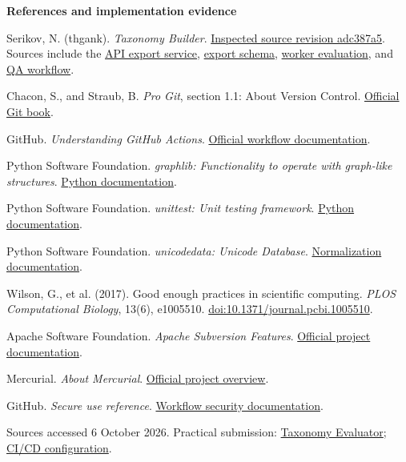 \documentclass[12pt,a4paper]{article}
\newcommand{\link}[2]{\href{#1}{#2}}
\begin{document}
\noindent\textbf{References and implementation evidence}\par
\noindent [1] Serikov, N. (thgank). \textit{Taxonomy Builder}. \link{https://github.com/thgank/taxonomy-builder/tree/adc387a5d227bf3ebb9c79a3fa0429415fe8b9cc}{Inspected source revision adc387a5}. Sources include the \link{https://github.com/thgank/taxonomy-builder/blob/adc387a5d227bf3ebb9c79a3fa0429415fe8b9cc/api-service/src/main/java/com/taxonomy/api/service/TaxonomyService.java}{API export service}, \link{https://github.com/thgank/taxonomy-builder/blob/adc387a5d227bf3ebb9c79a3fa0429415fe8b9cc/api-service/src/main/java/com/taxonomy/api/dto/response/TaxonomyExportResponse.java}{export schema}, \link{https://github.com/thgank/taxonomy-builder/blob/adc387a5d227bf3ebb9c79a3fa0429415fe8b9cc/worker-service/app/pipeline/evaluation.py}{worker evaluation}, and \link{https://github.com/thgank/taxonomy-builder/blob/adc387a5d227bf3ebb9c79a3fa0429415fe8b9cc/.github/workflows/qa.yml}{QA workflow}.\par
\noindent [2] Chacon, S., and Straub, B. \textit{Pro Git}, section 1.1: About Version Control. \link{https://git-scm.com/book/en/v2/Getting-Started-About-Version-Control}{Official Git book}.\par
\noindent [3] GitHub. \textit{Understanding GitHub Actions}. \link{https://docs.github.com/en/actions/get-started/understand-github-actions}{Official workflow documentation}.\par
\noindent [4] Python Software Foundation. \textit{graphlib: Functionality to operate with graph-like structures}. \link{https://docs.python.org/3/library/graphlib.html}{Python documentation}.\par
\noindent [5] Python Software Foundation. \textit{unittest: Unit testing framework}. \link{https://docs.python.org/3/library/unittest.html}{Python documentation}.\par
\noindent [6] Python Software Foundation. \textit{unicodedata: Unicode Database}. \link{https://docs.python.org/3/library/unicodedata.html}{Normalization documentation}.\par
\noindent [7] Wilson, G., et al. (2017). Good enough practices in scientific computing. \textit{PLOS Computational Biology}, 13(6), e1005510. \link{https://doi.org/10.1371/journal.pcbi.1005510}{doi:10.1371/journal.pcbi.1005510}.\par
\noindent [8] Apache Software Foundation. \textit{Apache Subversion Features}. \link{https://subversion.apache.org/features.html}{Official project documentation}.\par
\noindent [9] Mercurial. \textit{About Mercurial}. \link{https://www.mercurial-scm.org/about}{Official project overview}.\par
\noindent [10] GitHub. \textit{Secure use reference}. \link{https://docs.github.com/en/actions/reference/security/secure-use}{Workflow security documentation}.\par
\noindent Sources accessed 6 October 2026. Practical submission: \link{https://github.com/thgank/taxonomy-evaluator}{Taxonomy Evaluator}; \link{https://github.com/thgank/taxonomy-evaluator/blob/main/.github/workflows/ci.yml}{CI/CD configuration}.
\end{document}
